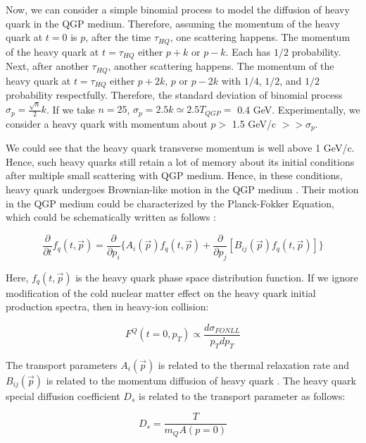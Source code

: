 Now, we can consider a simple binomial process to model the diffusion of heavy quark in the QGP medium. Therefore, assuming the momentum of the heavy quark at $t = 0$ is $p$, after the time $\tau_{HQ}$, one scattering happens. The momentum of the heavy quark at $t = \tau_{HQ}$ either $p + k$ or $p - k$. Each has $1/2$ probability. Next, after another $\tau_{HQ}$, another scattering happens. The momentum of the heavy quark at $t = \tau_{HQ}$ either $p + 2k$, $p$ or $p - 2k$ with $1/4$, $1/2$, and $1/2$ probability respectfully. Therefore, the standard deviation of binomial process $\sigma_p = \frac{\sqrt{n}}{2} k$. If we take $n = 25$, $\sigma_p = 2.5k \simeq 2.5 T_{QGP} =$ 0.4 GeV. Experimentally, we consider a heavy quark with momentum about $p  > $ 1.5 GeV/c $>> \sigma_p$. 






We could see that the heavy quark transverse momentum is well above 1 GeV/c. Hence, such heavy quarks still retain a lot of memory about its initial conditions after multiple small scattering with QGP medium. Hence, in these conditions, heavy quark undergoes Brownian-like motion in the QGP medium \cite{HQReview}. Their motion in the QGP medium could be characterized by the Planck-Fokker Equation, which could be schematically written as follows \cite{HQRaff}:

\begin{equation}
\frac{\partial}{\partial t} f_q(t, \vec{p}) = \frac{\partial}{\partial p_{i}} \{ A_i(\vec p) f_q(t,\vec{p}) + \frac{\partial}{\partial p_j}[B_{ij}(\vec{p})f_q(t,\vec{p}) ] \}
\end{equation}

Here, $f_q(t,\vec{p})$ is the heavy quark phase space distribution function. If we ignore modification of the cold nuclear matter effect on the heavy quark initial production spectra, then in heavy-ion collision:

\begin{equation}
F^Q( t = 0,p_T) \propto \frac{d\sigma_{FONLL}}{p_Tdp_T}
\end{equation}


The transport parameters $A_i(\vec{p})$ is related to the thermal relaxation rate and $B_{ij}(\vec{p})$ is related to the momentum diffusion of heavy quark \cite{HQReview}. The heavy quark special diffusion coefficient $D_s$ is related to the transport parameter as follows:

\begin{equation}
D_s = \frac{T} {m_Q A(p=0)}
\end{equation}

